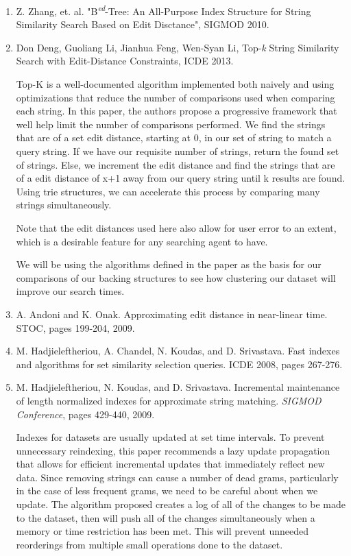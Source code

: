 \documentclass[pdftex,12pt,letter]{article}
\begin{document}
\begin{enumerate}
\item Z. Zhang, et. al. "B\textsuperscript{\textit{ed}}-Tree: An All-Purpose Index Structure for String Similarity Search Based on Edit Disctance", SIGMOD 2010.
\item Don Deng, Guoliang Li, Jianhua Feng, Wen-Syan Li, Top-\textit{k} String Similarity Search with Edit-Distance Constraints, ICDE 2013.


	Top-K is a well-documented algorithm implemented both naively and using optimizations that reduce the number of comparisons used when comparing each string. In this paper, the authors propose a progressive framework that well help limit the number of comparisons performed. We find the strings that are of a set edit distance, starting at 0, in our set of string to match a query string. If we have our requisite number of strings, return the found set of strings. Else, we increment the edit distance and find the strings that are of a edit distance of x+1 away from our query string until k results are found. Using trie structures, we can accelerate this process by comparing many strings simultaneously.

	Note that the edit distances used here also allow for user error to an extent, which is a desirable feature for any searching agent to have. 

	We will be using the algorithms defined in the paper as the basis for our comparisons of our backing structures to see how clustering our dataset will improve our search times. 


\item A. Andoni and K. Onak. Approximating edit distance in near-linear time. STOC, pages 199-204, 2009.
\item M. Hadjieleftheriou, A. Chandel, N. Koudas, and D. Srivastava. Fast indexes and algorithms for set similarity selection queries. ICDE 2008, pages 267-276.
\item M. Hadjieleftheriou, N. Koudas, and D. Srivastava. Incremental maintenance of length normalized indexes for approximate string matching. \textit{SIGMOD Conference}, pages 429-440, 2009.

Indexes for datasets are usually updated at set time intervals. To prevent unnecessary reindexing, this paper recommends a lazy update propagation that allows for efficient incremental updates that immediately reflect new data.  Since removing strings can cause a number of dead grams, particularly in the case of less frequent grams, we need to be careful about when we update. The algorithm proposed creates a log of all of the changes to be made to the dataset, then will push all of the changes simultaneously when a memory or time restriction has been met. This will prevent unneeded reorderings from multiple small operations done to the dataset. 


\end{enumerate}
\end{document}
